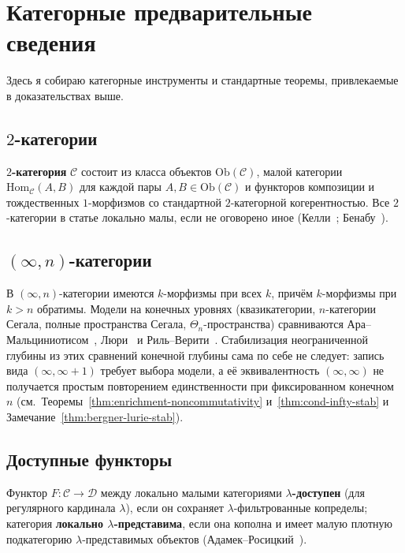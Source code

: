 \documentclass[11pt]{article}
\theoremstyle{plain}
\theoremstyle{definition}
\newcommand{\cC}{\mathcal{C}}
\newcommand{\cD}{\mathcal{D}}
\newcommand{\Ob}{\mathrm{Ob}}
\newcommand{\Hom}{\mathrm{Hom}}
\begin{document}
\appendix

\section{Категорные предварительные сведения}\label{app:categorical}

Здесь я собираю категорные инструменты и стандартные теоремы, привлекаемые в доказательствах выше.

\subsection{\texorpdfstring{$2$-категории}{2-категории}}

\textbf{$2$-категория} $\cC$ состоит из класса объектов $\Ob(\cC)$, малой категории $\Hom_\cC(A, B)$ для каждой пары $A, B \in \Ob(\cC)$ и функторов композиции и тождественных $1$-морфизмов со стандартной $2$-категорной когерентностью. Все $2$-категории в статье локально малы, если не оговорено иное (Келли~\cite{Kelly1982}; Бенабу~\cite{Benabou1967}).

\subsection{\texorpdfstring{$(\infty, n)$-категории}{(infinity,n)-категории}}

В $(\infty, n)$-категории имеются $k$-морфизмы при всех $k$, причём $k$-морфизмы при $k > n$ обратимы. Модели на конечных уровнях (квазикатегории, $n$-категории Сегала, полные пространства Сегала, $\Theta_n$-пространства) сравниваются Ара--Мальциниотисом~\cite{AraMaltsiniotis2017}, Люри~\cite{LurieHTT} и Риль--Верити~\cite{RiehlVerity2022}. Стабилизация неограниченной глубины из этих сравнений конечной глубины сама по себе не следует: запись вида $(\infty, \infty + 1)$ требует выбора модели, а её эквивалентность $(\infty, \infty)$ не получается простым повторением единственности при фиксированном конечном $n$ (см.\ Теоремы~\ref{thm:enrichment-noncommutativity} и~\ref{thm:cond-infty-stab} и Замечание~\ref{thm:bergner-lurie-stab}).

\subsection{Доступные функторы}

Функтор $F : \cC \to \cD$ между локально малыми категориями \textbf{$\lambda$-доступен} (для регулярного кардинала $\lambda$), если он сохраняет $\lambda$-фильтрованные копределы; категория \textbf{локально $\lambda$-представима}, если она кополна и имеет малую плотную подкатегорию $\lambda$-представимых объектов (Адамек--Росицкий~\cite{AdamekRosicky1994}).
\end{document}

